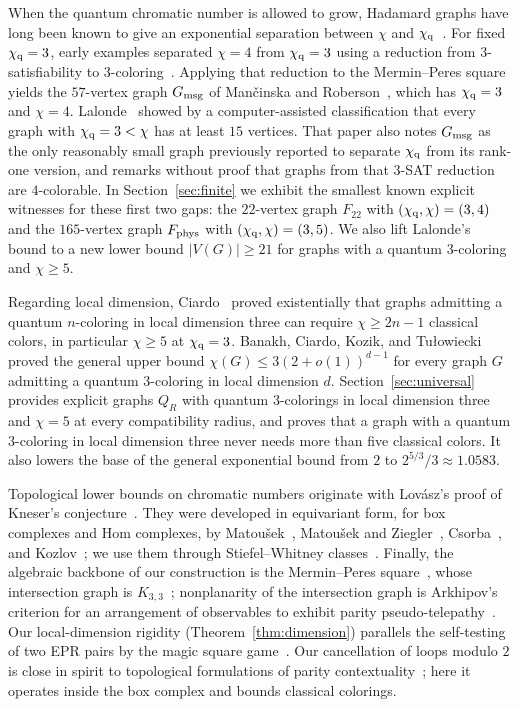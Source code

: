 When the quantum chromatic number is allowed to grow, Hadamard graphs have long been known to give an exponential separation between $\chi$ and $\chi_{\mathrm q}$~\cite{BCT,AHKS,FR}. For fixed $\chi_{\mathrm q}=3$, early examples separated $\chi=4$ from $\chi_{\mathrm q}=3$ using a reduction from $3$-satisfiability to $3$-coloring~\cite{FILG}. Applying that reduction to the Mermin--Peres square yields the $57$-vertex graph $G_{\rm msg}$ of Man{\v c}inska and Roberson~\cite[Theorem~2; Fact~4 in arXiv~v1]{MR2}, which has $\chi_{\mathrm q}=3$ and $\chi=4$. Lalonde~\cite[Theorem~1.1 of the arXiv version]{La} showed by a computer-assisted classification that every graph with $\chi_{\mathrm q}=3<\chi$ has at least $15$ vertices. That paper also notes $G_{\rm msg}$ as the only reasonably small graph previously reported to separate $\chi_{\mathrm q}$ from its rank-one version, and remarks without proof that graphs from that $3$-SAT reduction are $4$-colorable. In Section~\ref{sec:finite} we exhibit the smallest known explicit witnesses for these first two gaps: the $22$-vertex graph $F_{22}$ with $(\chi_{\mathrm q},\chi)=(3,4)$ and the $165$-vertex graph $F_{\rm phys}$ with $(\chi_{\mathrm q},\chi)=(3,5)$. We also lift Lalonde's bound to a new lower bound $|V(G)|\ge21$ for graphs with a quantum $3$-coloring and $\chi\ge5$.

Regarding local dimension, Ciardo~\cite[Corollary~35 and Example~36]{Ciardo24} proved existentially that graphs admitting a quantum $n$-coloring in local dimension three can require $\chi\ge2n-1$ classical colors, in particular $\chi\ge5$ at $\chi_{\mathrm q}=3$. Banakh, Ciardo, Kozik, and Tu{\l}owiecki~\cite[Theorem~29]{BCKT} proved the general upper bound $\chi(G)\le3(2+o(1))^{d-1}$ for every graph $G$ admitting a quantum $3$-coloring in local dimension $d$. Section~\ref{sec:universal} provides explicit graphs $Q_R$ with quantum $3$-colorings in local dimension three and $\chi=5$ at every compatibility radius, and proves that a graph with a quantum $3$-coloring in local dimension three never needs more than five classical colors. It also lowers the base of the general exponential bound from $2$ to $2^{5/3}/3\approx1.0583$.

Topological lower bounds on chromatic numbers originate with Lov{\'a}sz's proof of Kneser's conjecture~\cite{Lov78}. They were developed in equivariant form, for box complexes and Hom complexes, by Matou{\v s}ek~\cite{Mat}, Matou{\v s}ek and Ziegler~\cite{MZ}, Csorba~\cite{Csorba}, and Kozlov~\cite{Kozlov}; we use them through Stiefel--Whitney classes~\cite{MS}. Finally, the algebraic backbone of our construction is the Mermin--Peres square~\cite{Mermin,Peres,KS}, whose intersection graph is $K_{3,3}$~\cite[Example~20]{Arkhipov}; nonplanarity of the intersection graph is Arkhipov's criterion for an arrangement of observables to exhibit parity pseudo-telepathy~\cite[Theorem~21]{Arkhipov}. Our local-dimension rigidity (Theorem~\ref{thm:dimension}) parallels the self-testing of two EPR pairs by the magic square game~\cite{WBMS,CS}. Our cancellation of loops modulo $2$ is close in spirit to topological formulations of parity contextuality~\cite{ORBR}; here it operates inside the box complex and bounds classical colorings.

